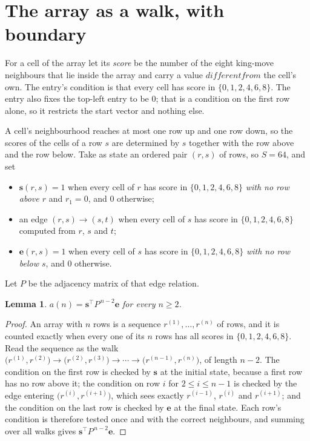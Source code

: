 \documentclass[11pt,a4paper]{article}
\theoremstyle{plain}
\newtheorem{lemma}[theorem]{Lemma}
\theoremstyle{definition}
\begin{document}
\section{The array as a walk, with boundary}

For a cell of the array let its \emph{score} be the number of the eight king-move neighbours that lie inside
the array and carry a value $different from$ the cell's own. The entry's condition is that every cell
has score in $\{0,1,2,4,6,8\}$. The entry also fixes the top-left entry to be $0$; that is a condition on the first row alone, so it restricts the start vector and nothing else.

A cell's neighbourhood reaches at most one row up and one row down, so the scores of the
cells of a row $s$ are determined by $s$ together with the row above and the row below.
Take as state an ordered pair $(r,s)$ of rows, so $S=64$, and set
\begin{itemize}
\item $\mathbf{s}(r,s)=1$ when every cell of $r$ has score in $\{0,1,2,4,6,8\}$ \emph{with no row
above $r$} and $r_1=0$, and $0$ otherwise;
\item an edge $(r,s)\to(s,t)$ when every cell of $s$ has score in $\{0,1,2,4,6,8\}$ computed from
$r$, $s$ and $t$;
\item $\mathbf{e}(r,s)=1$ when every cell of $s$ has score in $\{0,1,2,4,6,8\}$ \emph{with no row
below $s$}, and $0$ otherwise.
\end{itemize}
Let $P$ be the adjacency matrix of that edge relation.

\begin{lemma}\label{lem:walk}
$a(n)=\mathbf{s}^{\!\top}P^{\,n-2}\mathbf{e}$ for every $n\ge2$.
\end{lemma}

\begin{proof}
An array with $n$ rows is a sequence $r^{(1)},\dots,r^{(n)}$ of rows, and it is counted
exactly when every one of its $n$ rows has all scores in $\{0,1,2,4,6,8\}$. Read the sequence as the
walk $\bigl(r^{(1)},r^{(2)}\bigr)\to\bigl(r^{(2)},r^{(3)}\bigr)\to\cdots\to
\bigl(r^{(n-1)},r^{(n)}\bigr)$, of length $n-2$. The condition on the first row is
checked by $\mathbf{s}$ at the initial state, because a first row has no row above it; the
condition on row $i$ for $2\le i\le n-1$ is checked by the edge entering
$\bigl(r^{(i)},r^{(i+1)}\bigr)$, which sees exactly $r^{(i-1)}$, $r^{(i)}$ and
$r^{(i+1)}$; and the condition on the last row is checked by $\mathbf{e}$ at the final
state. Each row's condition is therefore tested once and with the correct neighbours, and
summing over all walks gives $\mathbf{s}^{\!\top}P^{\,n-2}\mathbf{e}$.
\end{proof}
\end{document}
